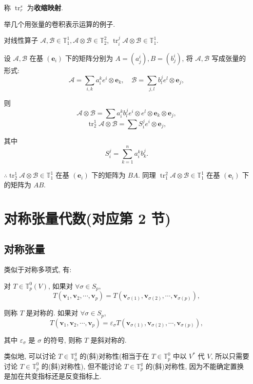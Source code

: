 \documentclass{ctexart}
\begin{document}
称 $\operatorname{tr}_r^s$ 为\textbf{收缩映射}.

举几个用张量的卷积表示运算的例子.
\begin{example}
    对线性算子 $\mathcal{A},\mathcal{B}\in\mathbb{T}_1^1,\mathcal{A}\otimes\mathcal{B}\in\mathbb{T}_2^2$, $\operatorname{tr}_i^j\mathcal{A}\otimes\mathcal{B}\in\mathbb{T}_1^1$.

    设 $\mathcal{A},\mathcal{B}$ 在基 $(\boldsymbol{e}_i)$ 下的矩阵分别为 $A=(a_j^i),B=(b_j^i)$, 将 $\mathcal{A},\mathcal{B}$ 写成张量的形式:
    \[\mathcal{A}=\sum\limits_{i,k}a_i^ke^i\otimes\boldsymbol{e}_k,\quad\mathcal{B}=\sum\limits_{j,l}b_l^je^l\otimes\boldsymbol{e}_j,\]

    则
    \[\mathcal{A}\otimes\mathcal{B}=\sum a_i^kb_l^je^i\otimes e^l\otimes\boldsymbol{e}_k\otimes\boldsymbol{e}_j,\]
    \[\operatorname{tr}_2^1\mathcal{A}\otimes\mathcal{B}=\sum S_i^je^i\otimes\boldsymbol{e}_j,\]

    其中
    \[S_i^j=\sum\limits_{k=1}^na_i^kb_k^j.\]

    $\therefore\operatorname{tr}_2^1\mathcal{A}\otimes\mathcal{B}\in\mathbb{T}_1^1$ 在基 $(\boldsymbol{e}_i)$ 下的矩阵为 $BA$. 同理 $\operatorname{tr}_1^2\mathcal{A}\otimes\mathcal{B}\in\mathbb{T}_1^1$ 在基 $(\boldsymbol{e}_i)$ 下的矩阵为 $AB$.
\end{example}
\section{对称张量代数(对应第 2 节)}
\subsection{对称张量}
类似于对称多项式, 有:
\begin{definition}
    对 $T\in\mathbb{T}_p^0(V)$, 如果对 $\forall\sigma\in S_p$,
    \[T(\boldsymbol{v}_1,\boldsymbol{v}_2,\cdots,\boldsymbol{v}_p)=T(\boldsymbol{v}_{\sigma(1)},\boldsymbol{v}_{\sigma(2)},\cdots,\boldsymbol{v}_{\sigma(p)}),\]

    则称 $T$ 是对称的. 如果对 $\forall\sigma\in S_p$,
    \[T(\boldsymbol{v}_1,\boldsymbol{v}_2,\cdots,\boldsymbol{v}_p)=\varepsilon_\sigma T(\boldsymbol{v}_{\sigma(1)},\boldsymbol{v}_{\sigma(2)},\cdots,\boldsymbol{v}_{\sigma(p)}),\]

    其中 $\varepsilon_\sigma$ 是 $\sigma$ 的符号, 则称 $T$ 是斜对称的.
\end{definition}

类似地, 可以讨论 $T\in\mathbb{T}^q_0$ 的(斜)对称性(相当于在 $T\in\mathbb{T}_p^0$ 中以 $V^*$ 代 $V$, 所以只需要讨论 $T\in\mathbb{T}^0_p$ 的(斜)对称性), 但不能讨论 $T\in\mathbb{T}^q_p$ 的(斜)对称性, 因为不能确定置换是加在共变指标还是反变指标上.
\end{document}
